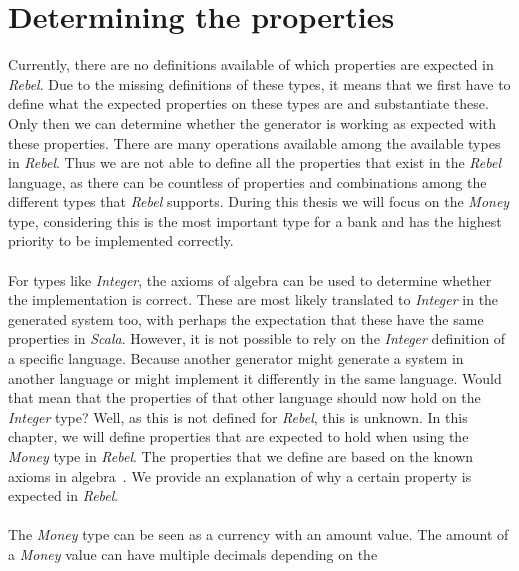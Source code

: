 \section{Determining the properties}
Currently, there are no definitions available of which properties are expected
in \textit{Rebel}. Due to the missing definitions of these types, it means that
we first have to define what the expected properties
on these types are and substantiate these. Only then we can determine whether
the generator is working as expected with these properties. There are many
operations available among the available types in \textit{Rebel}. Thus we are
not able to define all the properties that exist in the \textit{Rebel} language,
as there can be countless of properties and combinations among the different
types that \textit{Rebel} supports. During this thesis we will focus on the
\textit{Money} type, considering this is the most important type for a bank and
has the highest priority to be implemented correctly.\\
\\
For types like \textit{Integer}, the axioms of algebra can be used to determine whether
the implementation is correct. These are most likely translated to \textit{Integer} in
the generated system too, with perhaps the expectation that these have the same
properties in \textit{Scala}. However, it is not possible to rely on the
\textit{Integer} definition of a specific language. Because another generator
might generate a system in another language or might implement it differently in
the same language. Would that mean that the properties of that other language
should now hold on the \textit{Integer} type? Well, as this is not defined for
\textit{Rebel}, this is unknown. In this chapter, we will define properties that
are expected to hold when using the \textit{Money} type in \textit{Rebel}. The
properties that we define are based on the known axioms in
algebra~\cite{baumgart1961axioms,raftery2011perspective,apostol2007calculus}. We
provide an explanation of why a certain property is expected in
\textit{Rebel}.\\
\\
The \textit{Money} type can be seen as a currency with an amount value. The
amount of a \textit{Money} value can have multiple decimals depending on the
